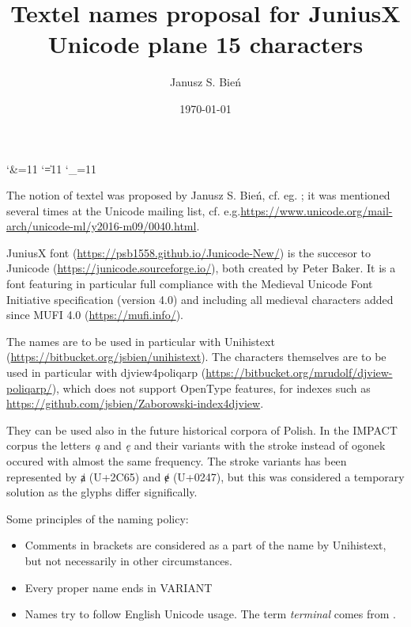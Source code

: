 \documentclass{article}
\begin{document}
% 
\title{Textel names proposal for JuniusX\\ Unicode plane 15 characters}

\author{Janusz S. Bień}

\date{\today}

\maketitle

\catcode`\&=11
\catcode`\|=11
\catcode`\_=11





The notion of textel was proposed by Janusz S. Bień,
cf. eg. %
\autocite{bc381}; it was mentioned several times at the Unicode
mailing list,
cf. e.g.\url{https://www.unicode.org/mail-arch/unicode-ml/y2016-m09/0040.html}.

JuniusX font (\url{https://psb1558.github.io/Junicode-New/}) is the
succesor to Junicode (\url{https://junicode.sourceforge.io/}),
both created by Peter Baker. It is a font featuring in particular full
compliance with the Medieval Unicode Font Initiative specification
(version 4.0) and including all medieval characters added
since MUFI 4.0 (\url{https://mufi.info/}).

The names are to be used in particular with \textsf{Unihistext}
(\url{https://bitbucket.org/jsbien/unihistext}).  The characters
themselves are to be used in particular with \textsf{djview4poliqarp}
(\url{https://bitbucket.org/mrudolf/djview-poliqarp/}), which does not
support OpenType features, for indexes such as
\url{https://github.com/jsbien/Zaborowski-index4djview}.

They can be used also in the future historical corpora of Polish.  In
the IMPACT corpus \autocite{bc289} the letters \textit{ą} and \textit{ę}
and their variants with the stroke instead of ogonek occured with
almost the same frequency. The stroke variants has been represented by
{ⱥ} (U+2C65) and {ɇ} (U+0247), but this was considered
 a temporary solution as the glyphs differ significally.

Some principles of the naming policy:
\begin{itemize}
\item Comments in brackets are considered as a part of the name by
  \textsf{Unihistext}, but not necessarily in other circumstances.
\item Every proper name ends in VARIANT
\item Names try to follow English Unicode usage. The term
  \textit{terminal} comes from
  \autocite{gaskell76:_nomec_letter_roman_type}.

\end{itemize}
\end{document}
